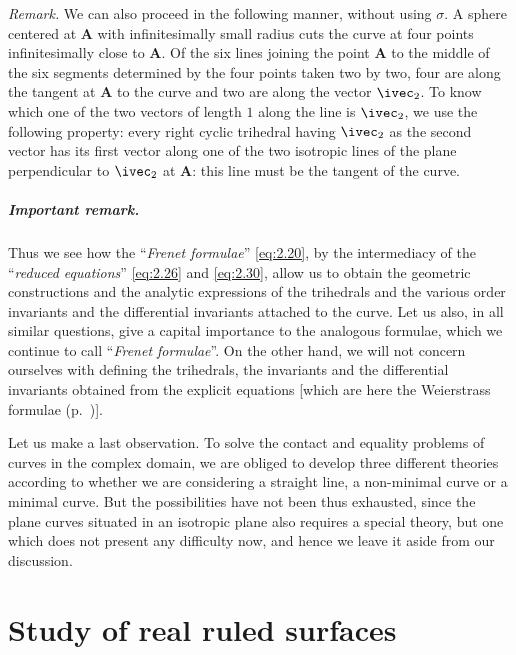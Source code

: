 \somespace

\emph{Remark.} We can also proceed in the following manner, without using $\sigma$. A sphere centered at $\mathbf{A}$ with infinitesimally small radius cuts the curve at four points infinitesimally close to $\mathbf{A}$.  Of the six lines joining the point $\mathbf{A}$ to the middle of the six segments determined by the four points taken two by two, four are along the tangent at $\mathbf{A}$ to the curve and two are along the vector $\ivec_{2}$. To know which one of the two vectors of length $1$ along the line is $\ivec_{2}$, we use the following property: every right cyclic trihedral having $\ivec_{2}$ as the second vector has its first vector along one of the two isotropic lines of the plane perpendicular to $\ivec_{2}$ at $\mathbf{A}$: this line must be the tangent of the curve.

\paragraph{Important remark.}
\label{sec:42}
Thus we see how the ``\emph{Frenet formulae}'' \eqref{eq:2.20}, by the intermediacy of the ``\emph{reduced equations}'' \eqref{eq:2.26} and \eqref{eq:2.30}, allow us to obtain the geometric constructions and the analytic expressions of the trihedrals and the various order invariants and the differential invariants attached to the curve. Let us also, in all similar questions, give a capital importance to the analogous formulae, which we continue to call ``\emph{Frenet formulae}''. On the other hand, we will not concern ourselves with defining the trihedrals, the invariants and the differential invariants obtained from the explicit equations [which are here the Weierstrass formulae (p.~\pageref{x:weierstrass})].

Let us make a last observation. To solve the contact and equality problems of curves in the complex domain, we are obliged to develop three different theories according to whether we are considering a straight line, a non-minimal curve or a minimal curve. But the possibilities have not been thus exhausted, since the plane curves situated in an isotropic plane also requires a special theory, but one which does not present any difficulty now, and hence we leave it aside from our discussion.

\chapter{Study of real ruled surfaces}
\label{cha:study-real-ruled}
